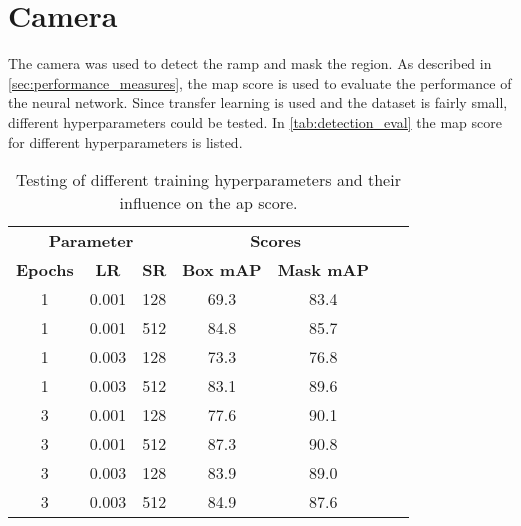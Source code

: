 \section{Camera}
The camera was used to detect the ramp and mask the region.
As described in \cref{sec:performance_measures}, the \gls{map} score is used to evaluate the performance of the neural network.
Since transfer learning is used and the dataset is fairly small, different hyperparameters could be tested.
In \cref{tab:detection_eval} the \gls{map} score for different hyperparameters is listed.

\begin{table}
	\centering
	\caption[Detection evaluation]{Testing of different training hyperparameters and their influence on the \acrshort{ap} score.}
	\label{tab:detection_eval3}
	\begin{tabular}[htb]{ccccccc}
		\toprule
		\multicolumn{3}{c}{\textbf{Parameter} } & \multicolumn{2}{c}{\textbf{Scores} }                                                      \\
		\cmidrule(lr){1-3}                       \cmidrule(lr){4-5}
		\textbf{Epochs}                         & \textbf{LR}                          & \textbf{SR} & \textbf{Box mAP} & \textbf{Mask mAP} \\
		\midrule
		1                                       & 0.001                                & 128         & 69.3             & 83.4              \\
		1                                       & 0.001                                & 512         & 84.8             & 85.7              \\
		1                                       & 0.003                                & 128         & 73.3             & 76.8              \\
		1                                       & 0.003                                & 512         & 83.1             & 89.6              \\
		3                                       & 0.001                                & 128         & 77.6             & 90.1              \\
		3                                       & 0.001                                & 512         & 87.3             & 90.8              \\
		3                                       & 0.003                                & 128         & 83.9             & 89.0              \\
		3                                       & 0.003                                & 512         & 84.9             & 87.6              \\
		\bottomrule
		
		\bottomrule
	\end{tabular}
\end{table}
